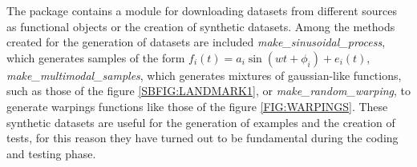 
The package contains a module for downloading datasets from different sources
as functional objects or the creation of synthetic datasets.
Among the methods created for the generation of datasets are included
\textit{make\_sinusoidal\_process}, which generates samples of the form
$f_i(t)=a_i\sin(wt + \phi_i) + e_i(t)$,
\textit{make\_multimodal\_samples}, which generates mixtures of gaussian-like
functions, such as those of the figure \ref{SBFIG:LANDMARK1},
 or \textit{make\_random\_warping}, to generate warpings functions like 
 those of the figure \ref{FIG:WARPINGS}.
 These synthetic datasets are useful for the generation of examples and the
 creation of tests, for this reason they have turned out to be fundamental
 during the coding and testing phase.
